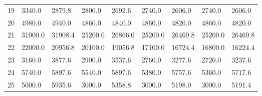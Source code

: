 \begin{tabular}{|r|l|l|l|l|l|l|l|l|}
  19 & 3340.0 & 2879.8 & 2800.0 & 2692.6 & 2740.0 & 2606.0 & 2740.0 & 2606.0 \\ 
  20 & 4980.0 & 4940.0 & 4860.0 & 4840.0 & 4860.0 & 4820.0 & 4860.0 & 4820.0 \\ 
  21 & 31000.0 & 31908.4 & 25200.0 & 26866.0 & 25200.0 & 26469.8 & 25200.0 & 26469.8 \\ 
  22 & 22000.0 & 20956.8 & 20100.0 & 19056.8 & 17100.0 & 16724.4 & 16800.0 & 16224.4 \\ 
  23 & 3160.0 & 3877.6 & 2900.0 & 3537.6 & 2760.0 & 3277.6 & 2720.0 & 3237.6 \\ 
  24 & 5740.0 & 5897.6 & 5540.0 & 5897.6 & 5380.0 & 5757.6 & 5360.0 & 5717.6 \\ 
  25 & 5000.0 & 5935.6 & 3000.0 & 5358.8 & 3000.0 & 5198.0 & 3000.0 & 5191.4 \\ 
\end{tabular}

